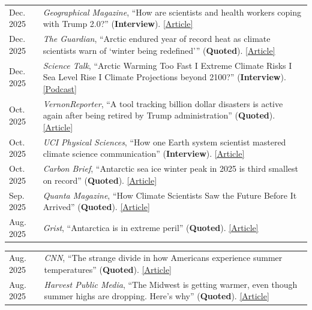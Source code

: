 \documentclass[margin,line,palatino,courier,10pt]{res}
\begin{document}
\begin{resume}
\begin{tabular}{@{}p{0.9in}p{4in}}
Dec. 2025 & \textit{Geographical Magazine}, ``How are scientists and health workers coping with Trump 2.0?'' (\textbf{Interview}). \href{https://geographical.co.uk/news/how-are-scientific-researchers-coping-with-trump-2-0}{[Article]}\\ 
Dec. 2025 & \textit{The Guardian}, ``Arctic endured year of record heat as climate scientists warn of `winter being redefined''' (\textbf{Quoted}). \href{https://www.theguardian.com/world/2025/dec/16/artic-record-heat-shrunken-sea-ice-report}{[Article]}\\ 
Dec. 2025 & \textit{Science Talk}, ``Arctic Warming Too Fast I Extreme Climate Risks I Sea Level Rise I Climate Projections beyond 2100?'' (\textbf{Interview}). \href{https://www.youtube.com/watch?v=6RlGo0JjUlI}{[Podcast]}\\
Oct. 2025 & \textit{VernonReporter}, ``A tool tracking billion dollar disasters is active again after being retired by Trump administration'' (\textbf{Quoted}). \href{https://vernonreporter.com/a-tool-tracking-billion-dollar-disasters-is-active-again-after-being-retired-by-trump-administration/}{[Article]}\\ 
Oct. 2025 & \textit{UCI Physical Sciences}, ``How one Earth system scientist mastered climate science communication'' (\textbf{Interview}). \href{https://ps.uci.edu/news/3388}{[Article]}\\
Oct. 2025 & \textit{Carbon Brief}, ``Antarctic sea ice winter peak in 2025 is third smallest on record'' (\textbf{Quoted}). \href{https://www.carbonbrief.org/antarctic-sea-ice-winter-peak-in-2025-is-third-smallest-on-record/}{[Article]}\\
Sep. 2025 & \textit{Quanta Magazine}, ``How Climate Scientists Saw the Future Before It Arrived'' (\textbf{Quoted}). \href{https://www.quantamagazine.org/how-climate-scientists-saw-the-future-before-it-arrived-20250915/}{[Article]}\\
Aug. 2025 & \textit{Grist}, ``Antarctica is in extreme peril'' (\textbf{Quoted}). \href{https://grist.org/climate/antarctica-is-in-extreme-peril/}{[Article]}\\
\end{tabular}
\begin{tabular}{@{}p{0.9in}p{4in}}
Aug. 2025 & \textit{CNN}, ``The strange divide in how Americans experience summer temperatures'' (\textbf{Quoted}). \href{https://www.cnn.com/2025/08/19/climate/us-summer-warming-hole-vis}{[Article]}\\
Aug. 2025 & \textit{Harvest Public Media}, ``The Midwest is getting warmer, even though summer highs are dropping. Here's why'' (\textbf{Quoted}). \href{https://www.kcur.org/news/2025-08-11/midwest-heat-high-temperatures-cooler}{[Article]}\\

\end{tabular}
\end{resume}
\end{document}
